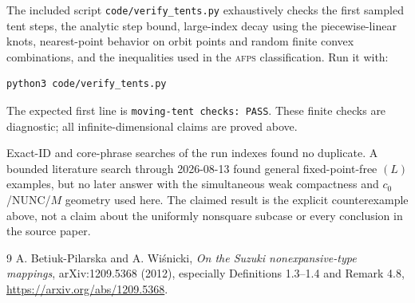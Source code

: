 \documentclass[10pt]{article}
\newcommand{\afps}{\textnormal{\textsc{afps}}\xspace}
\begin{document}
The included script \texttt{code/verify\_tents.py} exhaustively checks the
first sampled tent steps, the analytic step bound, large-index decay using
the piecewise-linear knots, nearest-point behavior on orbit points and
random finite convex combinations, and the inequalities used in the \afps
classification.  Run it with:
\begin{verbatim}
python3 code/verify_tents.py
\end{verbatim}
The expected first line is \texttt{moving-tent checks: PASS}.  These finite
checks are diagnostic; all infinite-dimensional claims are proved above.

Exact-ID and core-phrase searches of the run indexes found no duplicate.
A bounded literature search through 2026-08-13 found general
fixed-point-free $(L)$ examples, but no later answer with the simultaneous
weak compactness and $c_0$/NUNC/$M$ geometry used here.  The claimed result
is the explicit counterexample above, not a claim about the uniformly
nonsquare subcase or every conclusion in the source paper.

\begin{thebibliography}{9}
A. Betiuk-Pilarska and A. Wiśnicki,
\emph{On the Suzuki nonexpansive-type mappings},
arXiv:1209.5368 (2012), especially Definitions 1.3--1.4 and Remark 4.8,
\url{https://arxiv.org/abs/1209.5368}.
\end{thebibliography}
\end{document}
